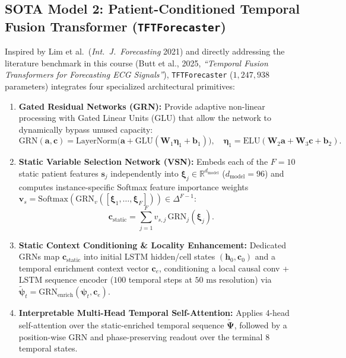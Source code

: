 \documentclass[11pt,a4paper]{article}
\begin{document}
\subsection{SOTA Model 2: Patient-Conditioned Temporal Fusion Transformer (\texttt{TFTForecaster})}
Inspired by Lim et al.\ (\emph{Int.\ J.\ Forecasting} 2021) and directly addressing the literature benchmark in this course (Butt et al., 2025, \emph{``Temporal Fusion Transformers for Forecasting ECG Signals''}), \texttt{TFTForecaster} ($1{,}247{,}938$ parameters) integrates four specialized architectural primitives:
\begin{enumerate}
    \item \textbf{Gated Residual Networks (GRN):} Provide adaptive non-linear processing with Gated Linear Units (GLU) that allow the network to dynamically bypass unused capacity:
    \begin{equation}
        \text{GRN}(\mathbf{a}, \mathbf{c}) = \text{LayerNorm}\big(\mathbf{a} + \text{GLU}(\mathbf{W}_1 \boldsymbol{\eta}_1 + \mathbf{b}_1)\big), \quad \boldsymbol{\eta}_1 = \text{ELU}(\mathbf{W}_2 \mathbf{a} + \mathbf{W}_3 \mathbf{c} + \mathbf{b}_2).
    \end{equation}
    \item \textbf{Static Variable Selection Network (VSN):} Embeds each of the $F = 10$ static patient features $\mathbf{s}_j$ independently into $\boldsymbol{\xi}_j \in \mathbb{R}^{d_{\text{model}}}$ ($d_{\text{model}} = 96$) and computes instance-specific Softmax feature importance weights $\mathbf{v}_s = \text{Softmax}(\text{GRN}_v([\boldsymbol{\xi}_1, \dots, \boldsymbol{\xi}_F])) \in \Delta^{F-1}$:
    \begin{equation}
        \mathbf{c}_{\text{static}} = \sum_{j=1}^{F} v_{s,j} \,\text{GRN}_j(\boldsymbol{\xi}_j).
    \end{equation}
    \item \textbf{Static Context Conditioning \& Locality Enhancement:} Dedicated GRNs map $\mathbf{c}_{\text{static}}$ into initial LSTM hidden/cell states $(\mathbf{h}_0, \mathbf{c}_0)$ and a temporal enrichment context vector $\mathbf{c}_e$, conditioning a local causal conv + LSTM sequence encoder ($100$ temporal steps at $50\text{ ms}$ resolution) via $\tilde{\boldsymbol{\psi}}_t = \text{GRN}_{\text{enrich}}(\boldsymbol{\psi}_t, \mathbf{c}_e)$.
    \item \textbf{Interpretable Multi-Head Temporal Self-Attention:} Applies 4-head self-attention over the static-enriched temporal sequence $\tilde{\boldsymbol{\Psi}}$, followed by a position-wise GRN and phase-preserving readout over the terminal $8$ temporal states.
\end{enumerate}
\end{document}
